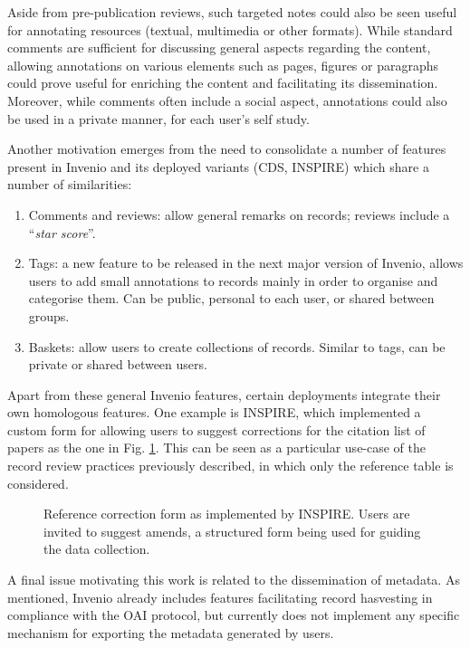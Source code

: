 Aside from pre-publication reviews, such targeted notes could also be seen
useful for annotating resources (textual, multimedia or other formats). While
standard comments are sufficient for discussing general aspects regarding the
content, allowing annotations on various elements such as pages, figures or
paragraphs could prove useful for enriching the content and facilitating its
dissemination. Moreover, while comments often include a social aspect,
annotations could also be used in a private manner, for each user's self study.

Another motivation emerges from the need to consolidate a number of features
present in Invenio and its deployed variants (CDS, INSPIRE) which share a number
of similarities:
\begin{enumerate}
  \item Comments and reviews: allow general remarks on records; reviews include
    a ``\textit{star score}''.
  \item Tags: a new feature to be released in the next major version of Invenio,
    allows users to add small annotations to records mainly in order to
    organise and categorise them. Can be public, personal to each user, or
    shared between groups.
  \item Baskets: allow users to create collections of records. Similar to tags,
    can be private or shared between users.
\end{enumerate}

Apart from these general Invenio features, certain deployments integrate their
own homologous features. One example is INSPIRE, which implemented a custom form
for allowing users to suggest corrections for the citation list of papers as the
one in Fig. \ref{fig:inspire}. This can be seen as a particular use-case of the
record review practices previously described, in which only the reference table
is considered.

\begin{figure}[!h]
  \centering
  \caption[Reference correction form as implemented by INSPIRE.]
          {Reference correction form as implemented by INSPIRE. Users are
           invited to suggest amends, a structured form being used for guiding
           the data collection.}
  \label{fig:inspire}
\end{figure}

A final issue motivating this work is related to the dissemination of metadata.
As mentioned, Invenio already includes features facilitating record hasvesting
in compliance with the OAI protocol, but currently does not implement any
specific mechanism for exporting the metadata generated by users.
